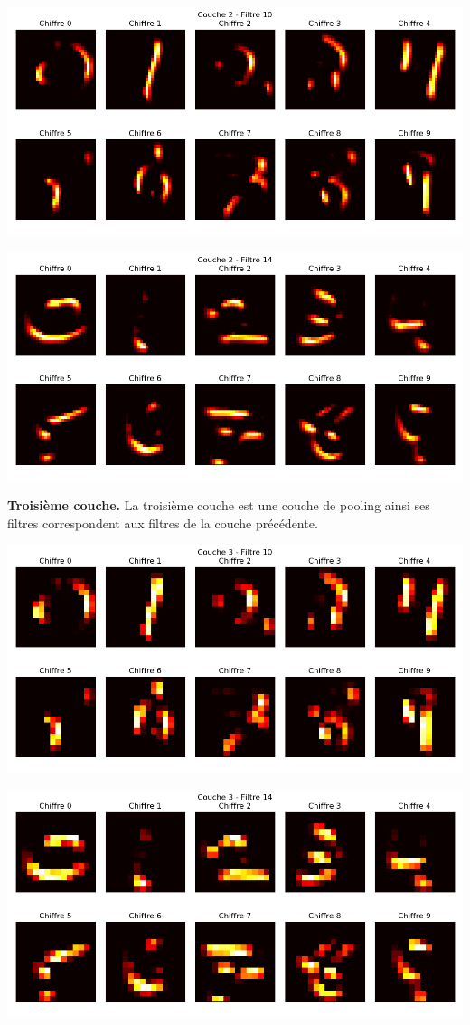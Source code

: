 \documentclass[11pt,class=report,crop=false]{standalone}
\begin{document}
\begin{center}
\includegraphics[scale=\myscale,scale=0.5]{figures/tfconv-viz3-c2-f10}
\end{center}

\begin{center}
\includegraphics[scale=\myscale,scale=0.5]{figures/tfconv-viz3-c2-f14}
\end{center}

\bigskip
\textbf{Troisième couche.}
La troisième couche est une couche de pooling ainsi ses filtres correspondent aux filtres de la couche précédente. 

\begin{center}
\includegraphics[scale=\myscale,scale=0.5]{figures/tfconv-viz3-c3-f10}
\end{center}

\begin{center}
\includegraphics[scale=\myscale,scale=0.5]{figures/tfconv-viz3-c3-f14}
\end{center}
\end{document}
